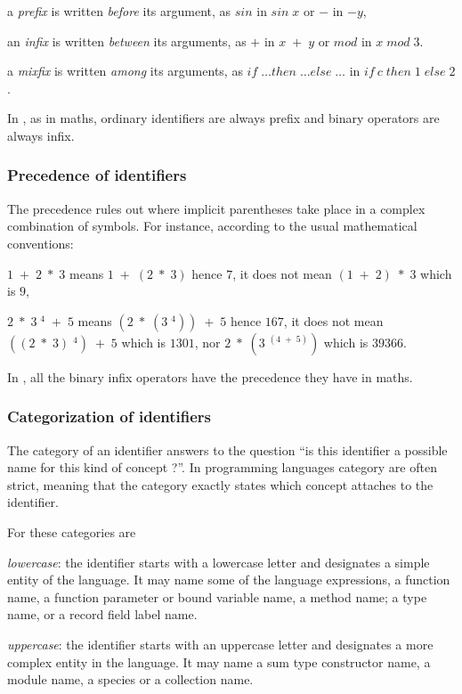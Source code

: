 \begin{citemize}
\item a {\em prefix} is written {\em before} its argument, as $sin$ in
 $sin\; x$ or $-$ in $- y$,
\item an {\em infix} is written {\em between} its arguments, as $+$ in
 $x\; +\; y$ or $mod$ in $x\; mod \;3$.
\item a {\em mixfix} is written {\em among} its arguments, as
  $if\; \ldots then\; \ldots else\; \ldots$ in
  $if\ c\; then\; 1\; else\; 2 $.
\end{citemize}

In {\focal}, as in maths, ordinary identifiers are always prefix and binary operators are
always infix.

\subsubsection{Precedence of identifiers}

The precedence rules out where implicit parentheses take place in a
complex combination of symbols. For instance, according to the usual mathematical
conventions:
\begin{citemize}
\item $1\; +\; 2\; *\; 3$  means $1\; +\; (2\; *\; 3)$ hence $7$,
      it does not mean $(1\; +\; 2)\; *\; 3$ which is $9$,
\item $2\; *\; 3\; ^4\; +\; 5$ means
      $(2\; *\; (3\; ^4))\; +\; 5$ hence $167$, it does not mean
      $((2\; *\; 3)\; ^4)\; +\; 5$ which is $1301$,
      nor $2\; *\; (3\; ^{(4\; +\; 5)})$ which is $39366$.
\end{citemize}

In {\focal}, all the binary infix operators have the precedence they have in maths.

\subsubsection{Categorization of identifiers}

The category of an identifier answers to the question ``is this identifier a
possible name for this kind of concept ?''.
In programming languages category are often strict, meaning that the category
exactly states which concept attaches to the identifier.

For {\focal} these categories are
\begin{citemize}
\item {\em lowercase}: the identifier starts with a lowercase letter and
  designates a simple entity of the language. It may name some of
  the language expressions, a function name, a function parameter or bound
  variable name, a method name; a type name, or a record field label name.

\item {\em uppercase}: the identifier starts with an uppercase letter and
  designates a more complex entity in the language. It may name a sum type
  constructor name, a module name, a species or a collection name.
\end{citemize}

